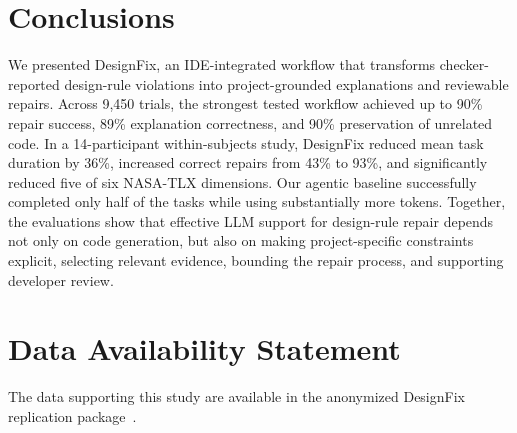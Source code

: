 \section{Conclusions}
\label{sec:conclusion}


We presented DesignFix, an IDE-integrated workflow that transforms
checker-reported design-rule violations into project-grounded
explanations and reviewable repairs. Across 9,450 trials, the strongest
tested workflow achieved up to 90\% repair success, 89\% explanation
correctness, and 90\% preservation of unrelated code. In a
14-participant within-subjects study, DesignFix reduced mean task
duration by 36\%, increased correct repairs from 43\% to 93\%, and
significantly reduced five of six NASA-TLX dimensions.
Our agentic baseline successfully completed only half of the tasks while using substantially more tokens.
Together, the evaluations show that effective LLM support for
design-rule repair depends not only on code generation, but also on
making project-specific constraints explicit, selecting relevant
evidence, bounding the repair process, and supporting developer review.

\section{Data Availability Statement}
\label{sec:data-availability}
The data supporting this study are available in the anonymized
DesignFix replication package~\cite{designfixArtifact2026}.



